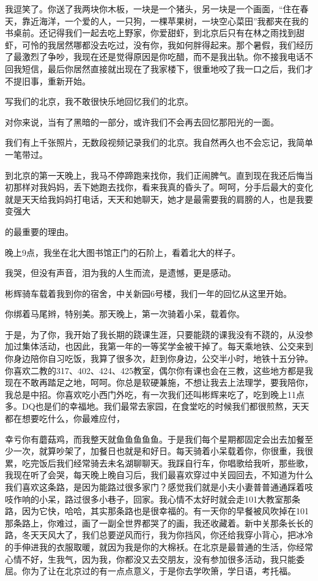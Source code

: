 \documentclass{article}
\begin{document}
\newpage 

我逗笑了。你送了我两块你木板，一块是一个猪头，另一块是一个画面，“住在春天，靠近海洋，一个爱的人，一只狗，一棵苹果树，一块空心菜田”我都夹在我的书桌前。还记得我们一起去吃上野家，你爱甜虾，到北京后只有在林之雨找到甜虾，可怜的我居然哪都没去吃过，没有你，我如何胖得起来。那个暑假，我们经历了最激烈了争吵，我现在还是觉得原因是你吃醋，而不是我出轨。你不接我电话不回我短信，最后你居然直接就出现在了我家楼下，很重地咬了我一口之后，我们才不提旧事，重新开始。

写我们的北京，我不敢很快乐地回忆我们的北京。

对你来说，当有了黑暗的一部分，或许我们不会再去回忆那阳光的一面。

我们有上千张照片，无数段视频记录我们的北京。我自然再久也不会忘记，我简单一笔带过。

到北京的第一天晚上，我马不停蹄跑来找你，我们正闹脾气。直到现在我还后悔当初那样对我妈妈，丢下她跑去找你，看来我真的昏头了。呵呵，分手后最大的变化就是天天给我妈妈打电话，天天和她聊天，她才是最需要我的肩膀的人，也是我要变强大

\newpage 

的最重要的理由。

晚上9点，我坐在北大图书馆正门的石阶上，看着北大的样子。

我哭，但没有声音，泪为我的人生而流，是遗憾，更是感动。

彬辉骑车载着我到你的宿舍，中关新园6号楼，我们一年的回忆从这里开始。

你绑着马尾辫，特别美。那天晚上，第一次骑着小呆，载着你。

于是，为了你，我开始了我长期的跷课生涯，只要能跷的课我没有不跷的，从没参加过集体活动，也因此，我第一年的一等奖学金被干掉了。每天乘地铁、公交来到你身边陪你自习吃饭，我算了很多次，赶到你身边，公交半小时，地铁十五分钟。你喜欢二教的317、402、424、425教室，偶尔你有课也会在三教，这些地方都是我现在不敢再踏足之地，呵呵。你总是软硬兼施，不想让我去上法理学，要我陪你，我总是中招。你喜欢吃小西门外吃，有一次我们还叫彬辉来吃了，吃到晚上11点多。DQ也是们的幸福地。我们最常去家园，在食堂吃的时候我们都很煎熬，天天都在想要吃什么，你最难应付，

\newpage 

幸亏你有蘑菇鸡，而我整天就鱼鱼鱼鱼鱼。于是我们每个星期都固定会出去加餐至少一次，就算吵架了，加餐日也就是和好日。每天骑着小呆载着你，你很重，我很累，吃完饭后我们经常骑去未名湖聊聊天。我踩自行车，你唱歌给我听，那些歌，我现在听了会哭，每天晚上晚自习后，我们最喜欢穿过中关园回去，不知道为什么我们喜欢这条路，是因为能路过很多家门？感觉我们就是小夫小妻普普通通踩着吱吱作响的小呆，路过很多小巷子，回家。我心情不太好时就会走101大教室那条路，因为它快，哈哈，其实那条路也是很幸福的。有一天你的早餐被风吹掉在101那条路上，你难过，画了一副全世界都哭了的画，我还收藏着。新中关那条长长的路，冬天天风大了，我们总要逆风而行，我为你挡风，你还给我穿小背心，把冰冷的手伸进我的衣服取暖，就因为我是你的大棉袄。在北京是最普通的生活，你经常心情不好，生我气，因为我，你都没又去交朋友，没有参加很多活动，我只能委屈。你为了让在北京过的有一点点意义，于是你去学吹箫，学日语，考托福。
\end{document}

